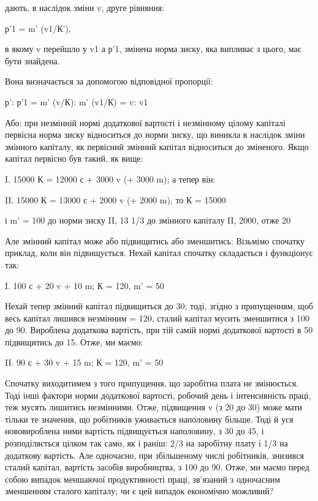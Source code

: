 дають, в наслідок зміни v, друге рівняння:

р'1 = m' (v1/К'),

в якому v перейшло у v1 а р'1, змінена норма зиску, яка випливає
з цього, має бути знайдена.

Вона визначається за допомогою відповідної пропорції:

р': р'1 = m' (v/К): m' (v1/К) = v: v1

Або: при незмінній нормі додаткової вартості і незмінному цілому
капіталі первісна норма зиску відноситься до норми зиску,
що виникла в наслідок зміни змінного капіталу, як первісний
змінний капітал відноситься до зміненого.
Якщо капітал первісно був такий, як вище:

I. 15000 К = 12000 с + 3000 v (+ 3000 m); а тепер він:

II. 15000 К = 13000 с + 2000 v (+ 2000 m), то К = 15000

і m' = 100%
до норми зиску II, 13 1/3%
до змінного капіталу II, 2000, отже 20%

Але змінний капітал може або підвищитись або зменшитись:
Візьмімо спочатку приклад, коли він підвищується. Нехай капітал
спочатку складається і функціонує так:

I. 100 с + 20 v + 10 m; К = 120, m' = 50%

Нехай тепер змінний капітал підвищиться до 30; тоді, згідно
з припущенням, щоб весь капітал лишився незмінним = 120, сталий
капітал мусить зменшитися з 100 до 90. Вироблена додаткова
вартість, при тій самій нормі додаткової вартості в 50%
підвищитись до 15. Отже, ми маємо:

II. 90 с + 30 v + 15 m; К = 120, m' = 50%

Спочатку виходитимем з того припущення, що заробітна
плата не змінюється. Тоді інші фактори норми додаткової вартості,
робочий день і інтенсивність праці, теж мусять лишитись
незмінними. Отже, підвищення v (з 20 до 30) може мати тільки
те значення, що робітників уживається наполовину більше.
Тоді й уся нововироблена ними вартість підвищується наполовину,
з 30 до 45, і розподіляється цілком так само, як і раніш:
2/3 на заробітну плату і 1/3 на додаткову вартість. Але одночасно,
при збільшеному числі робітників, знизився сталий капітал,
вартість засобів виробництва, з 100 до 90. Отже, ми маємо
перед собою випадок меншаючої продуктивності праці, зв’язаний
з одночасним зменшенням сталого капіталу; чи є цей випадок
економічно можливий?
